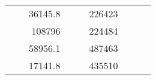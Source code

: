 \begin{table}[H]
\begin{tabular}{|ccrccrccc}
\multicolumn{1}{|c|}{\cellcolor[HTML]{FFFFC7}}                                & \multicolumn{1}{c|}{\cellcolor[HTML]{DAE8FC}}                      & \multicolumn{1}{r|}{\cellcolor[HTML]{DAE8FC}36145.8}   & \multicolumn{1}{c|}{\cellcolor[HTML]{FFFFC7}}                                & \multicolumn{1}{c|}{\cellcolor[HTML]{DAE8FC}}                       & \multicolumn{1}{r|}{\cellcolor[HTML]{DDFDFF}226423}    &                                                                              &                                                                    &                                                        \\ \cline{3-3} \cline{6-6}
\multicolumn{1}{|c|}{\cellcolor[HTML]{FFFFC7}}                                & \multicolumn{1}{c|}{\cellcolor[HTML]{DAE8FC}}                      & \multicolumn{1}{r|}{\cellcolor[HTML]{DDFDFF}108796}    & \multicolumn{1}{c|}{\cellcolor[HTML]{FFFFC7}}                                & \multicolumn{1}{c|}{\cellcolor[HTML]{DAE8FC}}                       & \multicolumn{1}{r|}{\cellcolor[HTML]{DAE8FC}224484}    &                                                                              &                                                                    &                                                        \\ \cline{3-3} \cline{6-6}
\multicolumn{1}{|c|}{\cellcolor[HTML]{FFFFC7}}                                & \multicolumn{1}{c|}{\cellcolor[HTML]{DAE8FC}}                      & \multicolumn{1}{r|}{\cellcolor[HTML]{DAE8FC}58956.1}   & \multicolumn{1}{c|}{\cellcolor[HTML]{FFFFC7}}                                & \multicolumn{1}{c|}{\cellcolor[HTML]{DAE8FC}}                       & \multicolumn{1}{r|}{\cellcolor[HTML]{DDFDFF}487463}    &                                                                              &                                                                    &                                                        \\ \cline{3-3} \cline{6-6}
\multicolumn{1}{|c|}{\cellcolor[HTML]{FFFFC7}}                                & \multicolumn{1}{c|}{\cellcolor[HTML]{DAE8FC}}                      & \multicolumn{1}{r|}{\cellcolor[HTML]{DDFDFF}17141.8}   & \multicolumn{1}{c|}{\cellcolor[HTML]{FFFFC7}}                                & \multicolumn{1}{c|}{\cellcolor[HTML]{DAE8FC}}                       & \multicolumn{1}{r|}{\cellcolor[HTML]{DAE8FC}435510}    &                                                                              &                                                                    &                                                        \\ \cline{3-3} \cline{6-6}

\end{tabular}
\end{table}

